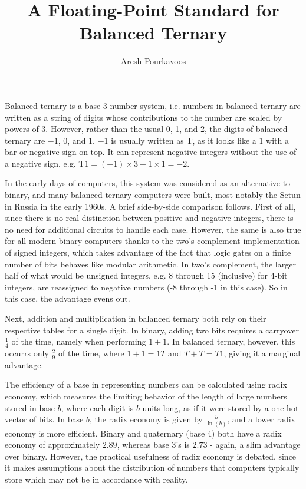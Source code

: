 \documentclass{article}
\begin{document}
\title{A Floating-Point Standard for Balanced Ternary}
\author{Aresh Pourkavoos}
\maketitle

\newcommand{\T}{\mathrm{T}}

Balanced ternary is a base 3 number system,
i.e. numbers in balanced ternary are written as a string of digits
whose contributions to the number are scaled by powers of 3.
However, rather than the usual 0, 1, and 2,
the digits of balanced ternary are $-1$, 0, and 1.
$-1$ is usually written as T, as it looks like a 1 with a bar or negative sign on top.
It can represent negative integers without the use of a negative sign,
e.g. $\T1 = (-1) \times 3 + 1 \times 1= -2$.

In the early days of computers,
this system was considered as an alternative to binary,
and many balanced ternary computers were built,
most notably the Setun in Russia in the early 1960s.
A brief side-by-side comparison follows.
First of all, since there is no real distinction between positive and negative integers,
there is no need for additional circuits to handle each case.
However, the same is also true for all modern binary computers
thanks to the two's complement implementation of signed integers,
which takes advantage of the fact that logic gates on a finite number of bits
behaves like modular arithmetic.
In two's complement, the larger half of what would be unsigned integers,
e.g. 8 through 15 (inclusive) for 4-bit integers,
are reassigned to negative numbers (-8 through -1 in this case).
So in this case, the advantage evens out.

Next, addition and multiplication in balanced ternary
both rely on their respective tables for a single digit.
In binary, adding two bits requires a carryover $\frac{1}{4}$ of the time,
namely when performing $1+1$.
In balanced ternary, however, this occurrs only $\frac{2}{9}$ of the time,
where $1+1=1T$ and $T+T=T1$,
giving it a marginal advantage. 

The efficiency of a base in representing numbers
can be calculated using radix economy,
which measures the limiting behavior
of the length of large numbers stored in base $b$,
where each digit is $b$ units long,
as if it were stored by a one-hot vector of bits.
In base $b$, the radix economy is given by $\frac{b}{\ln(b)}$,
and a lower radix economy is more efficient.
Binary and quaternary (base 4) both have
a radix economy of approximately $2.89$,
whereas base 3's is $2.73$ -
again, a slim advantage over binary.
However, the practical usefulness of radix economy is debated,
since it makes assumptions about the distribution
of numbers that computers typically store
which may not be in accordance with reality.
\end{document}
